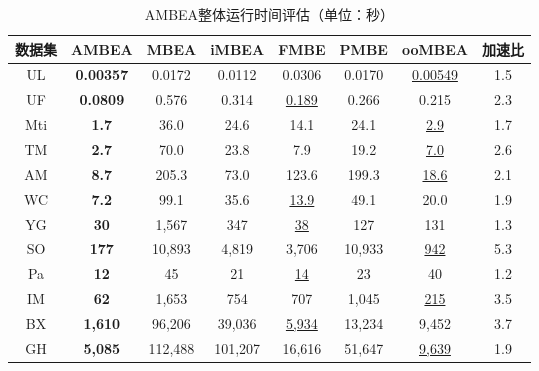 \begin{table} [H]
	\centering    
	\setlength{\abovecaptionskip}{0cm}  
  \setlength{\belowcaptionskip}{-0.1cm}
	\caption{AMBEA整体运行时间评估（单位：秒）}      
	\label{tbl:ambea_time}
	\setlength{\tabcolsep}{6pt}
	\begin{center}
				\normalsize{
		\begin{tabular}{cccccccc}
			\hline 

      \textbf{数据集} & \textbf{AMBEA} & \textbf{MBEA} & \textbf{iMBEA} & \textbf{FMBE} & \textbf{PMBE} & \textbf{ooMBEA} & \textbf{加速比} \\ \hline
      UL & \textbf{0.00357} & 0.0172 & 0.0112 & 0.0306 & 0.0170 & \uline{0.00549} & 1.5 \\
      UF & \textbf{0.0809} & 0.576 & 0.314 & \uline{0.189} & 0.266 & 0.215 & 2.3 \\
      Mti & \textbf{1.7} & 36.0 & 24.6 & 14.1 & 24.1 & \uline{2.9} & 1.7 \\
      TM & \textbf{2.7} & 70.0 & 23.8 & 7.9 & 19.2 & \uline{7.0} &2.6 \\
      AM & \textbf{8.7} & 205.3 & 73.0 & 123.6 & 199.3 & \uline{18.6} & 2.1 \\
      WC & \textbf{7.2} & 99.1 & 35.6 & \uline{13.9} & 49.1 & 20.0 & 1.9 \\
      YG & \textbf{30} & 1,567 & 347 & \uline{38} & 127 & 131 & 1.3\\
      SO & \textbf{177} & 10,893 & 4,819 & 3,706 & 10,933 & \uline{942} & 5.3 \\
      Pa & \textbf{12} & 45 & 21 & \uline{14} & 23 & 40 & 1.2\\
      IM & \textbf{62} & 1,653 & 754 & 707 & 1,045 & \uline{215} & 3.5 \\
      BX & \textbf{1,610} & 96,206 & 39,036 & \uline{5,934} & 13,234 & 9,452 & 3.7 \\
      GH & \textbf{5,085} & 112,488 & 101,207 & 16,616 & 51,647 & \uline{9,639} & 1.9 \\ \hline
      
		\end{tabular}
				}
	\end{center}

\end{table}
